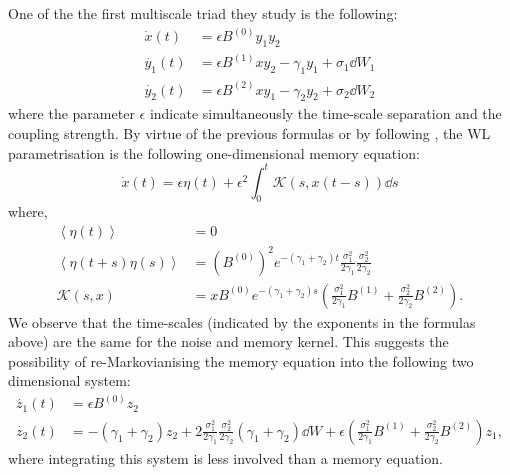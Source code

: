 \documentclass[12pt]{article}
\begin{document}
One of the the first multiscale triad they study is the following:
\begin{align}
	\dot{x}(t) & = \epsilon B^{(0)}y_1y_2 \\
	\dot{y_1}(t) & = \epsilon B^{(1)}xy_2 - \gamma _1y_1 + \sigma _1\dd W_1 \\ 
	\dot{y_2}(t) & = \epsilon B^{(2)}xy_1 - \gamma _2y_2 + \sigma _2\dd W_2
\end{align}
where the parameter $\epsilon$ indicate simultaneously the time-scale separation and the coupling strength. By virtue of the previous formulas or by following \cite{Wouters2016}, the WL parametrisation is the following one-dimensional memory equation:
\begin{equation}
	\dot{x}(t)=\epsilon \eta (t) + \epsilon ^2 \int _0^t\mathcal{K}(s,x(t-s))\dd s
\end{equation}
where,
\begin{align}
\left\langle \eta(t) \right\rangle & = 0 \\
\left\langle \eta(t+s)\eta(s) \right\rangle & = \left( B^{(0)}\right)^2e^{-(\gamma_1 + \gamma_2)t}\frac{\sigma_1^2}{2\gamma_1}\frac{\sigma_2^2}{2\gamma_2}\\ 
\mathcal{K}(s,x)&= xB^{(0)}e^{-(\gamma_1 + \gamma_2)s}\left( \frac{\sigma_1^2}{2\gamma_1}B^{(1)} + \frac{\sigma_2^2}{2\gamma_2}B^{(2)} \right).
\end{align}
We observe that the time-scales (indicated by the exponents in the formulas above) are the same for the noise and memory kernel. This suggests the possibility of re-Markovianising the memory equation into the following two dimensional system:
\begin{align}
	\dot{z_1}(t)&=\epsilon B^{(0)}z_2 \\ 
	\dot{z_2}(t)&=-(\gamma_1 + \gamma_2)z_2 + 2\frac{\sigma_1^2}{2\gamma_1}\frac{\sigma_2^2}{2\gamma_2} (\gamma_1 + \gamma_2)\dd W +\epsilon \left( \frac{\sigma_1^2}{2\gamma_1}B^{(1)} + \frac{\sigma_2^2}{2\gamma_2}B^{(2)} \right)z_1,
\end{align}
where integrating this system is less involved than a memory equation.
\end{document}
